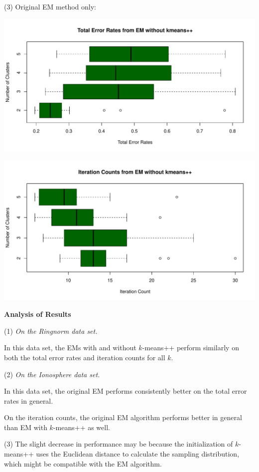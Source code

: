 \documentclass[a4paper,12pt]{article}
\begin{document}
\noindent (3) Original EM method only:
\begin{center}
  \includegraphics[width=0.8\linewidth]{Image/ProbEC1-TotalErr-Ionosphere-EM.pdf}
\end{center}
\begin{center}
  \includegraphics[width=0.8\linewidth]{Image/ProbEC1-ItrCount-Ionosphere-EM.pdf}
\end{center}




\bigskip
\begin{center}
    \textcolor{mydarkgreen}{\textbf{Analysis of Results}}
\end{center}

\noindent 
(1) \emph{On the Ringnorm data set.}

In this data set, the EMs with and without $k$-means++  perform similarly on both the total error rates and iteration counts for all $k$.
\bigskip


\noindent 
(2) \emph{On the Ionosphere data set.}

In this data set, the original EM performs consistently better on the total error rates in general. 

On the iteration counts, the original EM algorithm performs better in general than EM with $k$-means++ as well.
\bigskip

\noindent
(3) The slight decrease in performance may be because the initialization of $k$-means++ uses the Euclidean distance to calculate the sampling distribution, which might be compatible with the EM algorithm.
\bigskip\bigskip
\end{document}
